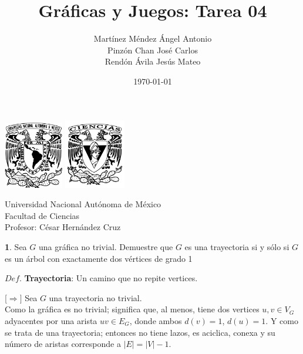 \documentclass[12pt]{article}
\title{\textbf{Gráficas y Juegos: Tarea 04}}
\author{Martínez Méndez Ángel Antonio\\Pinzón Chan José Carlos\\Rendón Ávila Jesús Mateo}
\date{\today}
\begin{document}
\maketitle
\begin{center}
\vspace{3cm}
\includegraphics[width=0.195\textwidth]{Escudo.png}
\hspace{0.5cm}
\includegraphics[width=0.2\textwidth]{logo_ciencias.png}
\end{center}
\begin{center}
    \vspace{1cm}
    Universidad Nacional Autónoma de México\\
    Facultad de Ciencias\\
    Profesor: César Hernández Cruz\\
\end{center}

\newpage

%
%
\textbf{1}. Sea $G$ una gráfica no trivial. Demuestre que $G$ es una trayectoria si 
y sólo si $G$ es un árbol con exactamente dos vértices de grado 1

\begin{tcolorbox}[title=\textbf{Definiciones}, colback=blue!15!white, colframe=black!, breakable]
    $Def$. \textbf{Trayectoria}: Un camino que no repite vertices.
\end{tcolorbox}

{\color{blue} [$\Rightarrow]$} Sea $G$ una trayectoria no trivial.\\

Como la gráfica es no trivial; significa que, al menos, tiene dos vertices $u,v \in V_G$ adyacentes por una 
arista $uv \in E_G$, donde ambos $d(v)=1$, $d(u)=1$. Y como se trata de una trayectoria; entonces no tiene lazos, es aciclica, 
conexa y su número de aristas corresponde a $|E| = |V|-1$.\\
\end{document}
